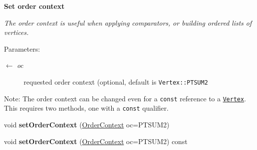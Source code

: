 \begin{Indent}{\bf Set order context}\par
{\em The order context is useful when applying comparators, or building ordered lists of vertices.

\begin{Desc}
\item[Parameters:]
\begin{description}
\item[\mbox{$\leftarrow$} {\em oc}]requested order context (optional, default is {\tt Vertex::PTSUM2} \end{description}
\end{Desc}
\begin{Desc}
\item[Note:]The order context can be changed even for a {\tt const} reference to a {\tt \hyperlink{classVertex}{Vertex}}. This requires two methods, one with a {\tt const} qualifier. \end{Desc}
}\begin{CompactItemize}
\item 
\hypertarget{classVertex_d9b9c2a255fcf0b04e403a208b4558a8}{
void \textbf{set\-Order\-Context} (\hyperlink{classVertex_40a06cc3fde98913c8259e3c11cd37ec}{Order\-Context} oc=PTSUM2)}
\label{classVertex_d9b9c2a255fcf0b04e403a208b4558a8}

\item 
\hypertarget{classVertex_623767a184739bc941b8e7b55dd469bd}{
void \textbf{set\-Order\-Context} (\hyperlink{classVertex_40a06cc3fde98913c8259e3c11cd37ec}{Order\-Context} oc=PTSUM2) const }
\label{classVertex_623767a184739bc941b8e7b55dd469bd}

\end{CompactItemize}
\end{Indent}
